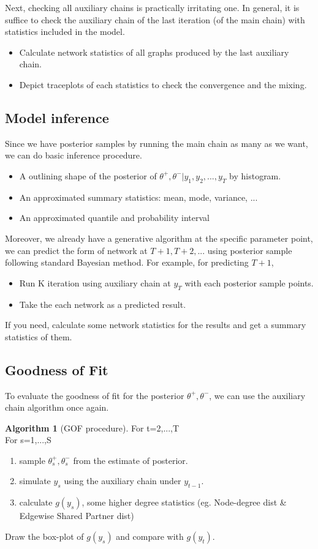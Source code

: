 \documentclass[aspectratio=169,ignorenonframetext,9pt]{beamer}
\theoremstyle{plain}
\theoremstyle{definition}
\newtheorem{algo}{Algorithm}[section]
\begin{document}
Next, checking all auxiliary chains is practically irritating one. 
In general, it is suffice to check the auxiliary chain of the last iteration (of the main chain)
with statistics included in the model.
\begin{itemize}
    \item Calculate network statistics of all graphs produced by the last auxiliary chain.
    \item Depict traceplots of each statistics to check the convergence and the mixing.
\end{itemize}



\subsection{Model inference}

Since we have posterior samples by running the main chain as many as we want, we can do basic inference procedure.
\begin{itemize}
    \item A outlining shape of the posterior of $\theta^+,\theta^-|y_1,y_2,...,y_T$ by histogram.
    \item An approximated summary statistics: mean, mode, variance, ...
    \item An approximated quantile and probability interval
\end{itemize}

Moreover, we already have a generative algorithm at the specific parameter point,
we can predict the form of network at $T+1,T+2,...$ using posterior sample following standard Bayesian method.
For example, for predicting $T+1$,
\begin{itemize}
    \item Run K iteration using auxiliary chain at $y_T$ with each posterior sample points.
    \item Take the each network as a predicted result.
\end{itemize}
If you need, calculate some network statistics for the results and get a summary statistics of them.


\subsection{Goodness of Fit}
To evaluate the goodness of fit for the posterior $\theta^+,\theta^-$,
we can use the auxiliary chain algorithm once again.
\begin{algo}[GOF procedure]
    For t=2,...,T
    \\For s=1,...,S
    \begin{enumerate}
        \item sample $\theta_s^+,\theta_s^-$ from the estimate of posterior.
        \item simulate $y_s$ using the auxiliary chain under $y_{t-1}$.
        \item calculate $g(y_s)$, some higher degree statistics (eg. Node-degree dist \& Edgewise Shared Partner dist)
    \end{enumerate}
    Draw the box-plot of $g(y_s)$ and compare with $g(y_t)$.
\end{algo}
\end{document}
